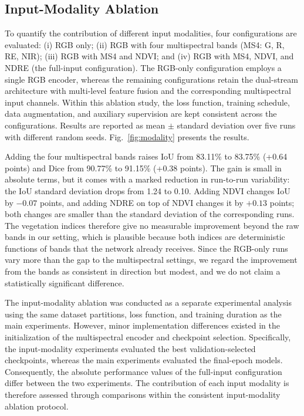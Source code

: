 \documentclass[pdflatex,sn-mathphys-num]{sn-jnl}
\begin{document}
\subsection{Input-Modality Ablation}
\label{sec:modality}

To quantify the contribution of different input
modalities, four configurations are evaluated:
(i) RGB only; (ii) RGB with four multispectral
bands (MS4: G, R, RE, NIR); (iii) RGB with MS4
and NDVI; and (iv) RGB with MS4, NDVI, and NDRE
(the full-input configuration). The RGB-only
configuration employs a single RGB encoder,
whereas the remaining configurations retain
the dual-stream architecture with multi-level
feature fusion and the corresponding
multispectral input channels. Within this
ablation study, the loss function, training
schedule, data augmentation, and auxiliary
supervision are kept consistent across the
configurations. Results are reported as mean
$\pm$ standard deviation over five runs with
different random seeds.
Fig.~\ref{fig:modality} presents the results.


Adding the four multispectral bands raises IoU from 83.11\% to 83.75\% (+0.64 points) and Dice from 90.77\% to 91.15\% (+0.38 points). The gain is small in absolute terms, but it comes with a marked reduction in run-to-run variability: the IoU standard deviation drops from 1.24 to 0.10. Adding NDVI changes IoU by $-0.07$ points, and adding NDRE on top of NDVI changes it by $+0.13$ points; both changes are smaller than the standard deviation of the corresponding runs. The vegetation indices therefore give no measurable improvement beyond the raw bands in our setting, which is plausible because both indices are deterministic functions of bands that the network already receives. Since the RGB-only runs vary more than the gap to the multispectral settings, we regard the improvement from the bands as consistent in direction but modest, and we do not claim a statistically significant difference.



The input-modality ablation was conducted as a
separate experimental analysis using the same
dataset partitions, loss function, and training
duration as the main experiments. However, minor
implementation differences existed in the
initialization of the multispectral encoder and
checkpoint selection. Specifically, the
input-modality experiments evaluated the best
validation-selected checkpoints, whereas the
main experiments evaluated the final-epoch
models. Consequently, the absolute performance
values of the full-input configuration differ
between the two experiments. The contribution
of each input modality is therefore assessed
through comparisons within the consistent
input-modality ablation protocol.
\end{document}
